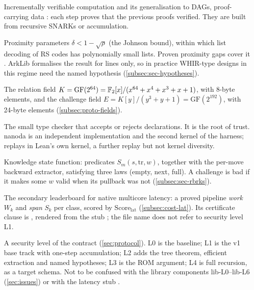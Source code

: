 \begin{description}[leftmargin=0pt,itemsep=2pt,parsep=0pt,font=\normalfont\bfseries]
\item[IVC; PCD.] Incrementally verifiable computation \cite{Val08} and its generalisation to DAGs,
  proof-carrying data \cite{CT10}: each step proves that the previous proofs verified. They are
  built from recursive SNARKs or accumulation.

\item[Johnson regime.] Proximity parameters $\delta<1-\sqrt\rho$ (the Johnson bound), within which
  list decoding of RS codes has polynomially small lists. Proven proximity gaps cover it
  \cite{BCIKS20,BCHKS25}. ArkLib formalises the result for lines only, so in practice WHIR-type
  designs in this regime need the named hypothesis  (\cref{subsec:sec-hypotheses}).

\item[$K$, $E$.] The relation field $K=\mathrm{GF}(2^{64})=\mathbb{F}_2[x]/(x^{64}+x^4+x^3+x+1)$, with
  8-byte elements, and the challenge field $E=K[y]/(y^3+y+1)=\mathrm{GF}(2^{192})$, with 24-byte
  elements (\cref{subsec:proto-fields}).

\item[Kernel (Lean).] The small type checker that accepts or rejects declarations. It is the root of
  trust. nanoda \cite{nanoda} is an independent implementation and the second kernel of the
  harness;  \cite{lean4checker} replays in Lean's own kernel, a further replay
  but not kernel diversity.

\item[KSF.] Knowledge state function: predicates $S_m(s,\mathrm{tr},w)$, together with the
  per-move backward extractor, satisfying three laws (empty, next, full). A challenge is bad if it
  makes some $w$ valid when its pullback was not (\cref{subsec:sec-rbrks}).

\item[Latency board; Latency1.] The secondary leaderboard for native multicore latency: a proved
  pipeline \emph{work} $W_k$ and \emph{span} $S_k$ per class, scored by
  $\mathrm{Score}_{\mathrm{lat}}$ (\cref{subsec:cost-lat}). Its certificate clause is
  , rendered from the stub ; the file name does not refer to
  security level L1.

\item[Level (L0--L4).] A security level of the contract (\cref{sec:protocol}). L0 is the baseline;
  L1 is the v1 base track with one-step accumulation; L2 adds the tree theorem, efficient
  extraction and named hypotheses; L3 is the ROM argument; L4 is full recursion, as a target
  schema. Not to be confused with the library components lib-L0--lib-L6 (\cref{sec:issues}) or
  with the latency stub .


\end{description}

